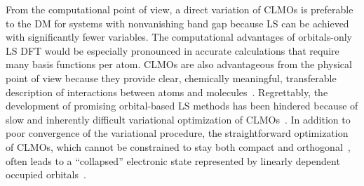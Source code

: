 \documentclass[aps,prl,twocolumn,reprint,amsmath,amssymb]{revtex4-1}
\begin{document}
From the computational point of view, a direct variation of CLMOs is preferable to the DM for systems with nonvanishing band gap because LS can be achieved with significantly fewer variables. 
The computational advantages of orbitals-only LS DFT would be especially pronounced in accurate calculations that require many basis functions per atom. 
CLMOs are also advantageous from the physical point of view because they provide clear, chemically meaningful, transferable description of interactions between atoms and molecules~\cite{stoll1980use, mo2000energy, khaliullin2007unravelling, khaliullin2013microscopic, mo2014block}. 
Regrettably, the development of promising orbital-based LS methods has been hindered because of slow and inherently difficult variational optimization of CLMOs~\cite{mauri1993orbital, ordejon1995linear, goedecker1999linear, fattebert2004linear, peng2013effective, tsuchida2008ab, peng2013effective}. 
%
%
In addition to poor convergence of the variational procedure, the straightforward optimization of CLMOs, which cannot be constrained to stay both compact and orthogonal~\cite{stoll1980use}, often leads to a ``collapsed'' electronic state represented by linearly dependent occupied orbitals~\cite{ordejon1995linear}. 
\end{document}
